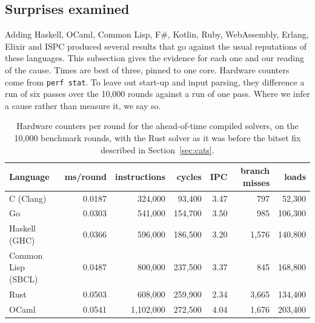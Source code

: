 \documentclass[11pt,a4paper]{article}
\theoremstyle{definition}
\theoremstyle{remark}
\begin{document}
\subsection{Surprises examined}\label{sec:surprises}

Adding Haskell, OCaml, Common Lisp, F\#, Kotlin, Ruby, WebAssembly, Erlang, Elixir and ISPC produced several results that go
against the usual reputations of these languages. This subsection gives the evidence for each one and our
reading of the cause. Times are best of three, pinned to one core. Hardware counters come from
\texttt{perf stat}. To leave out start-up and input parsing, they difference a run of six passes over the
10{,}000 rounds against a run of one pass. Where we infer a cause rather than measure it, we say so.

\begin{table}[ht]
\centering
\small
\begin{tabular}{@{}lrrrrrr@{}}
\toprule
Language & ms/round & instructions & cycles & IPC & branch misses & loads \\ \midrule
C (Clang)          & 0.0187 & 324{,}000 & 93{,}400  & 3.47 & 797   & 52{,}300 \\
Go                 & 0.0303 & 541{,}000 & 154{,}700 & 3.50 & 985   & 106{,}300 \\
Haskell (GHC)      & 0.0366 & 596{,}000 & 186{,}500 & 3.20 & 1{,}576 & 140{,}800 \\
Common Lisp (SBCL) & 0.0487 & 800{,}000 & 237{,}500 & 3.37 & 845   & 168{,}800 \\
Rust               & 0.0503 & 608{,}000 & 259{,}900 & 2.34 & 3{,}665 & 134{,}400 \\
OCaml              & 0.0541 & 1{,}102{,}000 & 272{,}500 & 4.04 & 1{,}676 & 203{,}400 \\ \bottomrule
\end{tabular}
\caption{Hardware counters per round for the ahead-of-time compiled solvers, on the 10{,}000 benchmark
rounds, with the Rust solver as it was before the bitset fix described in Section~\ref{sec:cats}.}\label{tab:counters}
\end{table}
\end{document}
